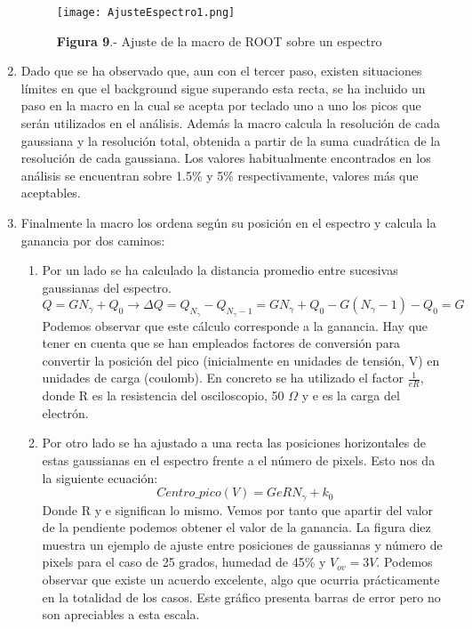 \begin{enumerate}
\begin{figure}[hbtp]
\centering
\texttt{[image: AjusteEspectro1.png]}
\caption{\textbf{Figura 9}.- Ajuste de la macro de ROOT sobre un espectro}
\end{figure}

\newpage
\item {} Dado que se ha observado que, aun con el tercer paso, existen situaciones límites en que el background sigue superando esta recta, se ha incluido un paso en la macro en la cual se acepta por teclado uno a uno los picos que serán utilizados en el análisis. Además la macro calcula la resolución de cada gaussiana y la resolución total, obtenida a partir de la suma cuadrática de la resolución de cada gaussiana. Los valores habitualmente encontrados en los análisis se encuentran sobre 1.5\% y 5\% respectivamente, valores más que aceptables.

\item {} Finalmente la macro los ordena según su posición en el espectro y calcula la ganancia por dos caminos:
	\begin{enumerate}

	\item {} Por un lado se ha calculado la distancia promedio entre sucesivas gaussianas del espectro.
	\begin{equation} 
	Q = G N_\gamma + Q_0 \longrightarrow \Delta Q= Q_{N_\gamma} - Q_{N_\gamma -1}=G N_\gamma+ Q_0 - G(N_		\gamma -1) - Q_0 = G
	\label{gananciametodo1}
	\end{equation}
	Podemos observar que este cálculo corresponde a la ganancia. Hay que tener en cuenta que se han empleados factores de conversión para convertir la posición del pico (inicialmente en unidades de	tensión, V) en unidades de carga (coulomb). En concreto se ha utilizado el factor $\frac{1}{eR}$, donde R es la resistencia del osciloscopio, 50 $\Omega$ y e es la carga del electrón.
	
	\item {} Por otro lado se ha ajustado a una recta las posiciones horizontales de estas gaussianas en el 	espectro frente a el número de pixels. Esto nos da la siguiente ecuación:
	\begin{equation}
	Centro\_pico(V) = GeRN_\gamma + k_0
	\label{gananciametodo2}
	\end{equation}
	Donde R y e significan lo mismo. Vemos por tanto que apartir del valor de la pendiente podemos obtener	el valor de la ganancia. La figura diez muestra un ejemplo de ajuste entre posiciones de gaussianas y número de pixels para el caso de 25 grados, humedad de 45\% y $V_{ov}=3V$. Podemos observar que existe	un acuerdo excelente, algo que ocurria prácticamente en la totalidad de los casos. Este gráfico presenta barras de error pero no son apreciables a esta escala.
		

\end{enumerate}
\end{enumerate}
